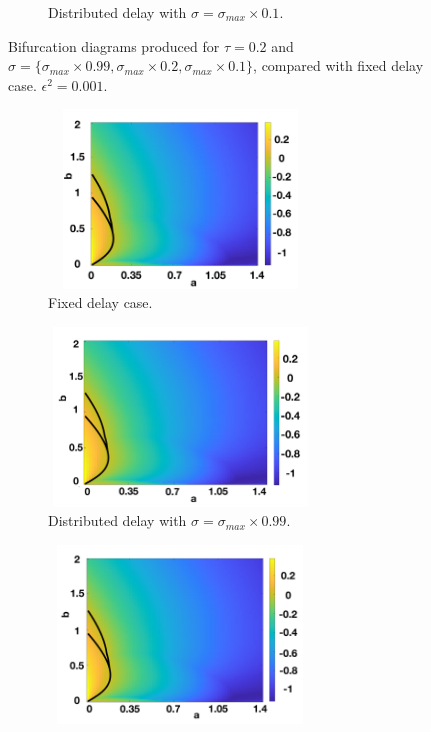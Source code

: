 \documentclass[12pt]{report}
\begin{document}
\begin{figure}[H]
\begin{subfigure}[b]{0.45\textwidth}
        \caption{Distributed delay with $\sigma=\sigma_{max}\times0.1$.}
        \label{}
    \end{subfigure}
    \caption{Bifurcation diagrams produced for $\tau=0.2$ and $\sigma=\{ \sigma_{max}\times0.99,\sigma_{max}\times0.2,\sigma_{max}\times0.1 \}$, compared with fixed delay case. $\epsilon^2=0.001$. }
    \label{fig:distbif1}
\end{figure}
\begin{figure}[H]
    \centering
    \begin{subfigure}[b]{0.45\textwidth}
        \centering
        \includegraphics[width=7cm,height=4.75cm]{distbif31.png}
        \caption{Fixed delay case.}
        \label{}
    \end{subfigure}
    \hfill
    \begin{subfigure}[b]{0.45\textwidth}
        \centering
        \includegraphics[width=7cm,height=4.75cm]{distbif32.png}
        \caption{Distributed delay with $\sigma=\sigma_{max}\times0.99$.}
        \label{}
    \end{subfigure}
    \hfill
    \begin{subfigure}[b]{0.45\textwidth}
        \centering
        \includegraphics[width=7cm,height=4.75cm]{distbif33.png}

\end{subfigure}
\end{figure}
\end{document}
